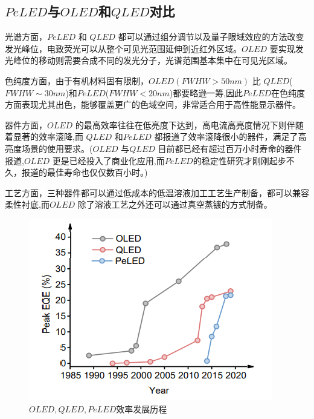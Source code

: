 \documentclass{beamer}[fontset=windows]
\begin{document}
\subsection{$PeLED$与$OLED$和$QLED$对比}
\begin{itemize}\small{
	\item 光谱方面，$PeLED$ 和 $QLED$ 都可以通过组分调节以及量子限域效应的方法改变发光峰位，电致荧光可以从整个可见光范围延伸到近红外区域。$OLED$ 要实现发光峰位的移动则需要合成不同的发光分子，光谱范围基本集中在可见光区域。
	\item 色纯度方面，由于有机材料固有限制，$OLED(FWHW>50 nm)$ 比 $QLED$($FWHW\sim 30 nm$)和$PeLED$($FWHW< 20 nm$)都要略逊一筹,因此$PeLED $在色纯度方面表现尤其出色，能够覆盖更广的色域空间，非常适合用于高性能显示器件。
	\item 器件方面，$OLED$ 的最高效率往往在低亮度下达到，高电流高亮度情况下则伴随着显著的效率滚降,而 $QLED$ 和$PeLED$ 都报道了效率滚降很小的器件，满足了高亮度场景的使用要求。($OLED$ 与$QLED$ 目前都已经有超过百万小时寿命的器件报道,$OLED$ 更是已经投入了商业化应用,而$PeLED$的稳定性研究才刚刚起步不久，报道的最佳寿命也仅仅数百小时\cite{wang2019trifluoroacetate}。)
	\item 工艺方面，三种器件都可以通过低成本的低温溶液加工工艺生产制备，都可以兼容柔性衬底,而$OLED$ 除了溶液工艺之外还可以通过真空蒸镀的方式制备。
}
\end{itemize}
\begin{frame}
	\begin{figure}[H]
		\centering
		\hspace{2em}\includegraphics[width=.8\linewidth]{pic/5.png}
		\caption{$OLED, QLED, PeLED $效率发展历程
		}
	\end{figure}
\end{frame}
\end{document}
